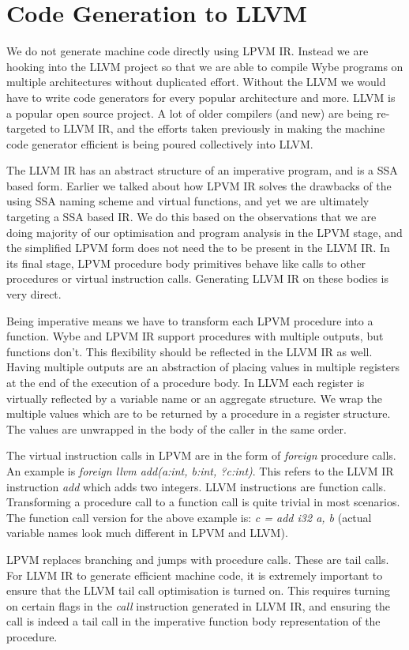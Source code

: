 \chapter{Code Generation to LLVM}


We do not generate machine code directly using LPVM IR. Instead we are hooking
into the LLVM project so that we are able to compile Wybe programs on multiple
architectures without duplicated effort. Without the LLVM we would have to
write code generators for every popular architecture and more. LLVM is a
popular open source project. A lot of older compilers (and new) are being
re-targeted to LLVM IR, and the efforts taken previously in making the machine
code generator efficient is being poured collectively into LLVM.

The LLVM IR has an abstract structure of an imperative program, and is a SSA
based form. Earlier we talked about how LPVM IR solves the drawbacks of the
using SSA naming scheme and virtual functions, and yet we are ultimately
targeting a SSA based IR. We do this based on the observations that we are
doing majority of our optimisation and program analysis in the LPVM stage, and
the simplified LPVM form does not need the \phif to be present in the LLVM
IR. In its final stage, LPVM procedure body primitives behave like calls to
other procedures or virtual instruction calls. Generating LLVM IR on these
bodies is very direct.

Being imperative means we have to transform each LPVM procedure into a
function. Wybe and LPVM IR support procedures with multiple outputs, but
functions don't. This flexibility should be reflected in the LLVM IR as
well. Having multiple outputs are an abstraction of placing values in multiple
registers at the end of the execution of a procedure body. In LLVM each
register is virtually reflected by a variable name or an aggregate
structure. We wrap the multiple values which are to be returned by a procedure
in a register structure. The values are unwrapped in the body of the caller in
the same order.

The virtual instruction calls in LPVM are in the form of \textit{foreign}
procedure calls. An example is \textit{foreign llvm add(a:int, b:int,
  ?c:int)}. This refers to the LLVM IR instruction \textit{add} which adds
two integers. LLVM instructions are function calls. Transforming a procedure
call to a function call is quite trivial in most scenarios. The function call
version for the above example is: \textit{c = add i32 a, b} (actual variable names
look much different in LPVM and LLVM).

LPVM replaces branching and jumps with procedure calls. These are tail
calls. For LLVM IR to generate efficient machine code, it is extremely
important to ensure that the LLVM tail call optimisation is turned on. This
requires turning on certain flags in the \textit{call} instruction generated
in LLVM IR, and ensuring the call is indeed a tail call in the imperative
function body representation of the procedure.

